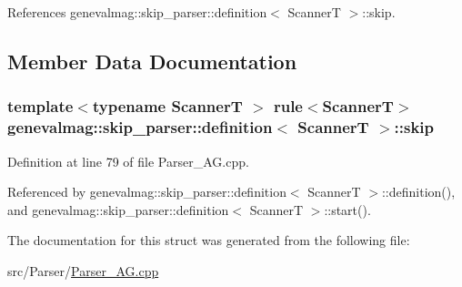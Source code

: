 References genevalmag::skip\_\-parser::definition$<$ ScannerT $>$::skip.



\subsection{Member Data Documentation}
\hypertarget{structgenevalmag_1_1skip__parser_1_1definition_a2398e67792c6720473244c0c6c9a0d93}{
\subsubsection[{skip}]{\setlength{\rightskip}{0pt plus 5cm}template$<$typename ScannerT $>$ rule$<$ScannerT$>$ {\bf genevalmag::skip\_\-parser::definition}$<$ ScannerT $>$::{\bf skip}}}
\label{structgenevalmag_1_1skip__parser_1_1definition_a2398e67792c6720473244c0c6c9a0d93}


Definition at line 79 of file Parser\_\-AG.cpp.



Referenced by genevalmag::skip\_\-parser::definition$<$ ScannerT $>$::definition(), and genevalmag::skip\_\-parser::definition$<$ ScannerT $>$::start().



The documentation for this struct was generated from the following file:\begin{DoxyCompactItemize}
\item 
src/Parser/\hyperlink{Parser__AG_8cpp}{Parser\_\-AG.cpp}\end{DoxyCompactItemize}
